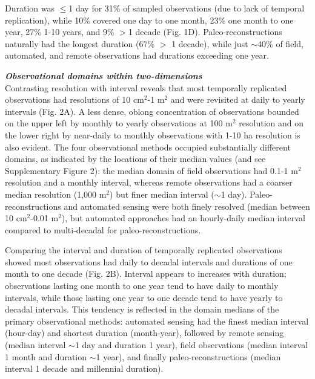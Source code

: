 \documentclass[12pt]{article}
\begin{document}
Duration was $\leq$1 day for 31\% of sampled observations (due to lack of temporal replication), while 10\% covered one day to one month, 23\% one month to one year, 27\% 1-10 years, and 9\% $>$1 decade (Fig. 1D). Paleo-reconstructions naturally had the longest duration (67\% $>$ 1 decade), while just $\sim$40\% of field, automated, and remote observations had durations exceeding one year.

\vspace{5pt}
\noindent \textbf{\emph{Observational domains within two-dimensions}}\\
Contrasting resolution with interval reveals that most temporally replicated observations had resolutions of 10 cm$^2$-1 m$^2$ and were revisited at daily to yearly intervals (Fig. 2A). A less dense, oblong concentration of observations bounded on the upper left by monthly to yearly observations at 100 m$^2$ resolution and on the lower right by near-daily to monthly observations with 1-10 ha resolution is also evident. The four observational methods occupied substantially different domains, as indicated by the locations of their median values (and see Supplementary Figure 2): the median domain of field observations had 0.1-1 m$^2$ resolution and a monthly interval, whereas remote observations had a coarser median resolution (1,000 m$^2$) but finer median interval ($\sim$1 day). Paleo-reconstructions and automated sensing were both finely resolved (median between 10 cm$^2$-0.01 m$^2$), but automated approaches had an hourly-daily median interval compared to multi-decadal for paleo-reconstructions. 

Comparing the interval and duration of temporally replicated observations showed most observations had daily to decadal intervals and durations of one month to one decade (Fig. 2B). Interval appears to increases with duration; observations lasting one month to one year tend to have daily to monthly intervals, while those lasting one year to one decade tend to have yearly to decadal intervals. This tendency is reflected in the domain medians of the primary observational methods: automated sensing had the finest median interval (hour-day) and shortest duration (month-year), followed by remote sensing (median interval $\sim$1 day and duration 1 year), field observations (median interval 1 month and duration $\sim$1 year), and finally paleo-reconstructions (median interval 1 decade and millennial duration). 
\end{document}
